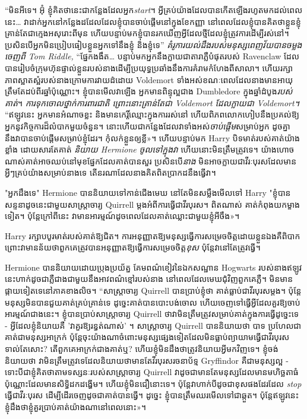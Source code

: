 {{“មិនអីទេ។ អ៊ុំ ខ្ញុំគិតថានេះជាកន្លែងដែលអ្នក\emph{start}។ អ្វីគ្រប់យ៉ាងដែលបានកើតឡើងរហូតមកដល់ពេលនេះ… វាដាក់អ្នកនៅកន្លែងដដែលដែលខ្ញុំបានចាប់ផ្តើមនៅក្នុងខែកញ្ញា នៅពេលដែលខ្ញុំបានគិតថាខ្លួនខ្ញុំគ្រាន់តែជាក្មេងអសុរោះពីមុន ហើយបន្ទាប់មកខ្ញុំបានរកឃើញអ្វីដែលថ្មីដែលខ្ញុំត្រូវការដើម្បីរស់នៅ។ ប្រសិនបើអ្នកមិនប្រៀបធៀបខ្លួនអ្នកទៅនឹងខ្ញុំ និងខ្ញុំទេ” \emph{គំរូការយល់ដឹងរបស់មនុស្សពេញវ័យបានចម្លងចេញពី Tom Riddle,} “ផ្នែកងងឹត… បន្ទាប់មកអ្នកនឹងក្លាយជាតារាភ្លឺបំផុតរបស់ Ravenclaw ដែលបានរៀបចំក្រុមហ៊ុនផ្ទាល់ខ្លួនរបស់នាងដើម្បីប្រយុទ្ធប្រឆាំងនឹងការគំរាមកំហែងពីសាលា។ ហើយរក្សាភាពស្អាតស្អំរបស់នាងក្រោមការវាយដំដោយ Voldemort ទាំងអស់ខណៈពេលដែលនាងមានអាយុត្រឹមតែដប់ពីរឆ្នាំប៉ុណ្ណោះ។ ខ្ញុំបានមើលវាឡើង អ្នកមានពិន្ទុល្អជាង Dumbledore ក្នុងឆ្នាំដំបូង\emph{របស់គាត់}។ \emph{ការទុកចោលថ្នាក់ការពារជាតិ ព្រោះនោះគ្រាន់តែជា Voldemort ដែលក្លាយជា Voldemort។} “ឥឡូវនេះ អ្នកមានអំណាចខ្លះ និងមានកេរ្តិ៍ឈ្មោះក្នុងការរស់នៅ ហើយពិភពលោកហៀបនឹងប្រគល់ឱ្យអ្នកនូវកិច្ចការដ៏លំបាកមួយចំនួន។ នោះហើយជាកន្លែងដែលវាទាំងអស់\emph{ចាប់ផ្តើម}សម្រាប់អ្នក ដូចគ្នានឹងវាបានចាប់ផ្តើមសម្រាប់ខ្ញុំដែរ។ កុំ​លក់​ខ្លួន​ឲ្យ​ខ្លី»។ ហើយបន្ទាប់មក Harry បិទមាត់របស់គាត់យ៉ាងខ្លាំង ដោយសារតែគាត់ \emph{និយាយ Hermione ចូលទៅក្នុងវា} ហើយនោះមិនត្រឹមត្រូវទេ។ យ៉ាងហោចណាស់គាត់អាចឈប់នៅមុខផ្នែកដែលគាត់បានសួរ ប្រសិនបើ\emph{នាង} មិនអាចក្លាយជាវីរៈបុរសដែលមានអ្វីៗគ្រប់យ៉ាងសម្រាប់នាងទេ តើនរណាដែលនាងគិតពិតប្រាកដនឹងធ្វើវា។

"អ្នកដឹងទេ" Hermione បាននិយាយទៅកាន់ជើងមេឃ នៅតែមិនសម្លឹងមើលទៅ Harry "ខ្ញុំបានសន្ទនាដូចនេះជាមួយសាស្រ្តាចារ្យ Quirrell ម្តងអំពីការធ្វើជាវីរបុរស។ ពិត​ណាស់ គាត់​កំពុង​យក​ម្ខាង​ទៀត។ ប៉ុន្តែ​ក្រៅ​ពី​នេះ វា​មាន​អារម្មណ៍​ដូច​ពេល​ដែល​គាត់​ឈ្លោះ​ជាមួយ​ខ្ញុំ​អីចឹង»។

Harry រក្សាបបូរមាត់របស់គាត់ឱ្យជិត។ ការអនុញ្ញាតឱ្យមនុស្សធ្វើការសម្រេចចិត្តដោយខ្លួនឯងគឺពិបាក ព្រោះវាមានន័យថាពួកគេត្រូវបានអនុញ្ញាតឱ្យធ្វើការសម្រេចចិត្ត\emph{ខុស} ប៉ុន្តែវានៅតែត្រូវធ្វើ។

Hermione បាននិយាយដោយប្រុងប្រយ័ត្ន គែមពណ៌ខៀវនៃឯកសណ្ឋាន Hogwarts របស់នាងឥឡូវនេះហាក់ដូចជាភ្លឺជាងជាមួយនឹងអាវពណ៌ខ្មៅរបស់នាង នៅពេលដែលមេឃជុំវិញពួកគេភ្លឺ។ មិនមានផ្កាយទៀតទេនៅភាគខាងលិច។ “សាស្រ្តាចារ្យ Quirrell បានប្រាប់ខ្ញុំថា គាត់ធ្លាប់ជាវីរបុរសម្តង។ ប៉ុន្តែ​មនុស្ស​មិន​បាន​ជួយ​គាត់​គ្រប់គ្រាន់​ទេ ដូច្នេះ​គាត់​បាន​បោះបង់​ចោល ហើយ​ចេញ​ទៅ​ធ្វើ​អ្វី​ដែល​គួរ​ឱ្យ​ចាប់​អារម្មណ៍​ជាង​នេះ។ ខ្ញុំបានប្រាប់សាស្រ្តាចារ្យ Quirrell ថាវាមិនត្រឹមត្រូវសម្រាប់គាត់ក្នុងការធ្វើដូច្នេះទេ - អ្វីដែលខ្ញុំនិយាយគឺ 'វាគួរឱ្យរន្ធត់ណាស់' ។ សាស្រ្តាចារ្យ Quirrell បាននិយាយថា បាទ ប្រហែលជាគាត់ជាមនុស្សអាក្រក់ ប៉ុន្តែចុះយ៉ាងណាចំពោះមនុស្សផ្សេងទៀតដែលមិនធ្លាប់ព្យាយាមធ្វើជាវីរបុរសទាល់តែសោះ? តើពួកគេអាក្រក់ជាងគាត់ឬ? ហើយខ្ញុំមិនដឹងថាត្រូវនិយាយអ្វីមកវិញទេ។ ខ្ញុំចង់និយាយថា វាមិនត្រឹមត្រូវទេដែលនិយាយថាមានតែវីរបុរសរចនាប័ទ្ម Gryffindor គឺជាមនុស្សល្អ - ទោះបីជាខ្ញុំគិតថាតាមទស្សនៈរបស់សាស្រ្តាចារ្យ Quirrell វាដូចជាមានតែមនុស្សដែលមានមហិច្ឆតាធំប៉ុណ្ណោះដែលមានសិទ្ធិដកដង្ហើម។ ហើយ​ខ្ញុំ​មិន​ជឿ​នោះ​ទេ។ ប៉ុន្តែវាហាក់បីដូចជាខុសផងដែរដែល \emph{stop} ធ្វើជាវីរៈបុរស ដើម្បីដើរចេញដូចជាគាត់បានធ្វើ។ ដូច្នេះ ខ្ញុំ​បាន​ត្រឹម​ឈរ​មើល​ទៅ​ជា​ឆ្កួត។ ប៉ុន្តែ​ឥឡូវ​នេះ ខ្ញុំ​ដឹង​ថា​ខ្ញុំ​គួរ​ប្រាប់​គាត់​យ៉ាង​ណា​នៅ​ពេល​នោះ»។

}}
